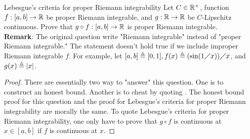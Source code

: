 \documentclass{report}
\begin{document}
\begin{question}{Lebesgue's criteria for proper Riemann integrability}{}
Let $C\in\mathbb{R}^+$, function $f:[a,b]\rightarrow \mathbb{R}$ be proper Riemann integrable, and $g:\mathbb{R}\rightarrow \mathbb{R}$ be $C$-Lipschitz continuous. Prove that $g\circ f:[a,b]\rightarrow \mathbb{R}$ is proper Riemann integrable.\\ 

\textbf{Remark}: The original question write "Riemann integrable" instead of "proper Riemann integrable." The statement doesn't  hold true if we include improper Riemann integrable $f$. For example, let  $[a,b]\triangleq [0,1],f(x)\triangleq (\sin (1\diagup x))\diagup x$, and $g(x)\triangleq \left|x\right|$. 
\end{question}
\begin{proof}
There are essentially two way to "answer" this question. One is to construct an honest bound. Another is to cheat by quoting . The honest bound proof for this question and the proof for Lebesgue's criteria for proper Riemann integrability are morally the same. To quote Lebesgue's criteria for proper Riemann integrability, one only have to prove that $g\circ f$ is continuous at $x\in [a,b]$ if $f$ is continuous at  $x$.  
\end{proof}
\end{document}
